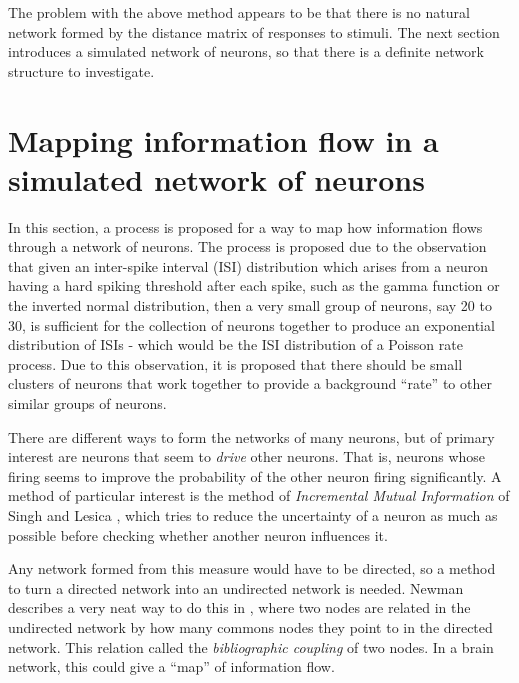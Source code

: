 The problem with the above method appears to be that there is no natural network formed by the distance matrix of responses to stimuli. The next section introduces a simulated network of neurons, so that there is a definite network structure to investigate.

\section{Mapping information flow in a simulated network of neurons}

In this section, a process is proposed for a way to map how information flows through a network of neurons.  The process is proposed due to the observation that given an inter-spike interval (ISI) distribution which arises from a neuron having a hard spiking threshold after each spike, such as the gamma function or the inverted normal distribution, then a very small group of neurons, say 20 to 30, is sufficient for the collection of neurons together to produce an exponential distribution of ISIs - which would be the ISI distribution of a Poisson rate process.  Due to this observation, it is proposed that there should be small clusters of neurons that work together to provide a background ``rate'' to other similar groups of neurons.

There are different ways to form the networks of many neurons, but of primary interest are neurons that seem to {\sl drive} other neurons.  That 
is, neurons whose firing seems to improve the probability of the other neuron 
firing significantly.  A method of particular interest is the method of 
{\sl Incremental Mutual Information} of Singh and Lesica 
\citep{SinghLesica2010a}, which tries to reduce the uncertainty of a neuron as 
much as possible before checking whether another neuron influences it.

Any network formed from this measure would have to be directed, so a 
method to turn a directed network into an undirected network is needed.  Newman describes 
a very neat way to do this in \citep{Newman2010a}, where two nodes are related 
in the undirected network by how many commons nodes they point to in the 
directed network.  This relation called the {\sl bibliographic coupling} of two 
nodes.  In a brain network, this could give a ``map'' of information flow.

